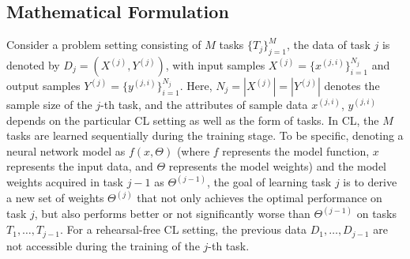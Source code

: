 \subsection{Mathematical Formulation}

Consider a problem setting consisting of $M$ tasks $\{T_j\}_{j=1}^M$, the data of task $j$ is denoted by $D_j = (X^{(j)}, Y^{(j)})$, with input samples $X^{(j)} = \{x^{(j,i)}\}_{i=1}^{N_j}$ and output samples $Y^{(j)} = \{y^{(j,i)}\}_{i=1}^{N_j}$. Here, $N_j = |X^{(j)}| = |Y^{(j)}|$ denotes the sample size of the $j$-th task, and the attributes of sample data $x^{(j,i)}$, $y^{(j,i)}$ depends on the particular CL setting as well as the form of tasks. In CL, the $M$ tasks are learned sequentially during the training stage. To be specific, denoting a neural network model as $f(x, \Theta)$ (where $f$ represents the model function, $x$ represents the input data, and $\Theta$ represents the model weights) and the model weights acquired in task $j-1$ as $\Theta^{(j-1)}$, the goal of learning task $j$ is to derive a new set of weights $\Theta^{(j)}$ that not only achieves the optimal performance on task $j$, but also performs better or not significantly worse than $\Theta^{(j-1)}$ on tasks $T_1, \dots, T_{j-1}$. For a rehearsal-free CL setting, the previous data $D_1, \dots, D_{j-1}$ are not accessible during the training of the $j$-th task.




